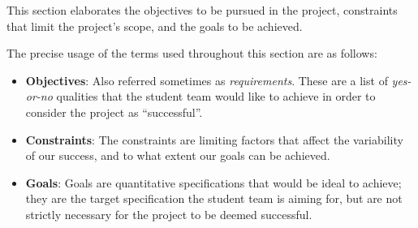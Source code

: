 This section elaborates the objectives to be pursued in the project, 
constraints that limit the project's scope, 
and the goals to be achieved.

The precise usage of the terms used throughout this section are as follows:

\begin{itemize}
    \item \textbf{Objectives}: Also referred sometimes as \textit{requirements}. 
    These are a list of \textit{yes-or-no} qualities that the student team 
    would like to achieve in order to consider the project as ``successful''.
    
    \item \textbf{Constraints}: The constraints are limiting factors that
    affect the variability of our success, and to what extent our goals
    can be achieved.

    \item \textbf{Goals}: Goals are quantitative specifications that would 
    be ideal to achieve; they are the target specification the student team
    is aiming for, but are not strictly necessary for the project to be deemed
    successful.

\end{itemize}